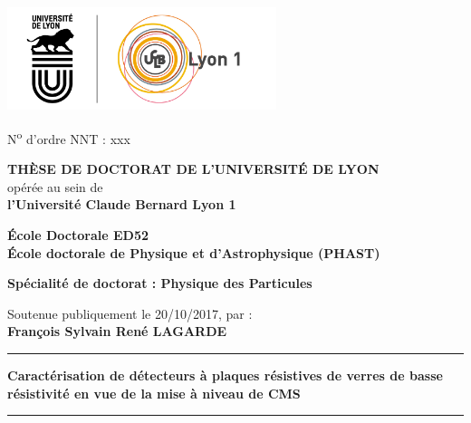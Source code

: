 	\fancyhf{}
	\setlength{\parindent}{0pt}
	\thispagestyle{empty}
	\begin{center}
		\includegraphics[height=3cm]{PG/logo.png} %
	\end{center}
	\vspace{-0.5cm}
	\fontsize{11pt}{13pt}\selectfont
	N\textsuperscript{o} d'ordre NNT : xxx
	
	\vspace{0.5cm}
	
	\begin{center}
		\fontsize{14pt}{16pt}\selectfont
		\textbf{\uppercase{Thèse de doctorat de l'université de Lyon}}\\
		\fontsize{12pt}{14pt}\selectfont
		opérée au sein de\\
		\textbf{l'Université Claude Bernard Lyon 1}
		
		\vspace{0.25cm}
		
		\textbf{École Doctorale ED52\\ École doctorale de Physique et d’Astrophysique (PHAST)}%
		
		\vspace{0.25cm}
		\textbf{Spécialité de doctorat : Physique des Particules}
		\vspace{0.25cm}
		
		Soutenue publiquement le 20/10/2017, par :\\
		\fontsize{14pt}{16pt}\selectfont
		\textbf{François Sylvain René LAGARDE}
	  
		\rule[20pt]{\textwidth}{0.5pt}
		\fontsize{23pt}{26pt}\selectfont
		\textbf{Caractérisation de détecteurs à plaques résistives de verres de basse résistivité en vue de la mise à niveau de CMS}
		\rule{\textwidth}{0.5pt}

	\end{center}
	
